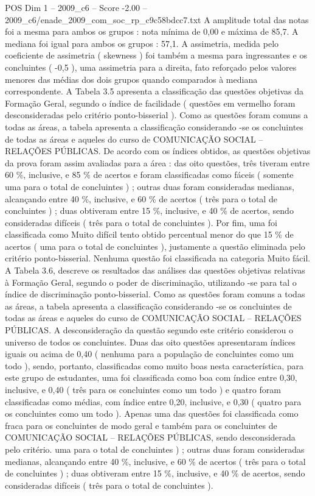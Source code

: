 \begin{textsample}{POS Dim 1 – 2009\_c6 – Score -2.00 – 2009\_c6/enade\_2009\_com\_soc\_rp\_c9c58bdcc7.txt}
A amplitude total das notas foi a mesma para ambos os grupos : nota mínima de 0,00 e máxima de 85,7.
A mediana foi igual para ambos os grupos : 57,1.
A assimetria, medida pelo coeficiente de assimetria ( skewness ) foi também a mesma para ingressantes e os concluintes ( -0,5 ), uma assimetria para a direita, fato reforçado pelos valores menores das médias dos dois grupos quando comparados à mediana correspondente.
A Tabela 3.5 apresenta a classificação das questões objetivas da Formação Geral, segundo o índice de facilidade ( questões em vermelho foram desconsideradas pelo critério ponto-bisserial ).
Como as questões foram comuns a todas as áreas, a tabela apresenta a classificação considerando -se os concluintes de todas as áreas e aqueles do curso de COMUNICAÇÃO SOCIAL – RELAÇÕES PÚBLICAS.
De acordo com os índices obtidos, as questões objetivas da prova foram assim avaliadas para a área : das oito questões, três tiveram entre 60 \%, inclusive, e 85 \% de acertos e foram classificadas como fáceis ( somente uma para o total de concluintes ) ; outras duas foram consideradas medianas, alcançando entre 40 \%, inclusive, e 60 \% de acertos ( três para o total de concluintes ) ; duas obtiveram entre 15 \%, inclusive, e 40 \% de acertos, sendo consideradas difíceis ( três para o total de concluintes ).
Por fim, uma foi classificada como Muito difícil tento obtido percentual menor do que 15 \% de acertos ( uma para o total de concluintes ), justamente a questão eliminada pelo critério ponto-bisserial.
Nenhuma questão foi classificada na categoria Muito fácil.
A Tabela 3.6, descreve os resultados das análises das questões objetivas relativas à Formação Geral, segundo o poder de discriminação, utilizando -se para tal o índice de discriminação ponto-bisserial.
Como as questões foram comuns a todas as áreas, a tabela apresenta a classificação considerando -se os concluintes de todas as áreas e aqueles do curso de COMUNICAÇÃO SOCIAL – RELAÇÕES PÚBLICAS.
A desconsideração da questão segundo este critério considerou o universo de todos os concluintes.
Duas das oito questões apresentaram índices iguais ou acima de 0,40 ( nenhuma para a população de concluintes como um todo ), sendo, portanto, classificadas como muito boas nesta característica, para este grupo de estudantes, uma foi classificada como boa com índice entre 0,30, inclusive, e 0,40 ( três para os concluintes como um todo ) e quatro foram classificadas como médias, com índice entre 0,20, inclusive, e 0,30 ( quatro para os concluintes como um todo ).
Apenas uma das questões foi classificada como fraca para os concluintes de modo geral e também para os concluintes de COMUNICAÇÃO SOCIAL – RELAÇÕES PÚBLICAS, sendo desconsiderada pelo critério. uma para o total de concluintes ) ; outras duas foram consideradas medianas, alcançando entre 40 \%, inclusive, e 60 \% de acertos ( três para o total de concluintes ) ; duas obtiveram entre 15 \%, inclusive, e 40 \% de acertos, sendo consideradas difíceis ( três para o total de concluintes ).

\end{textsample}
